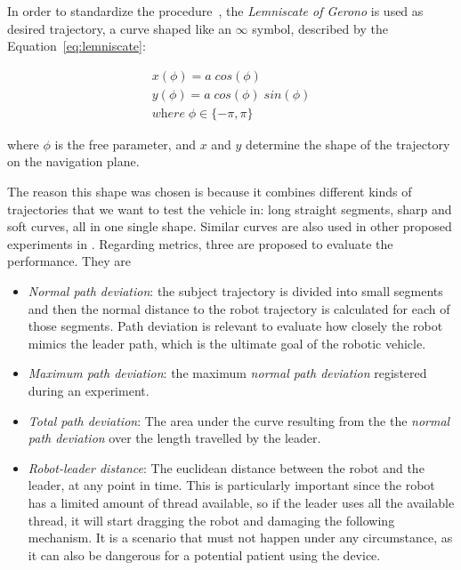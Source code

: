 \documentclass[journal]{IEEEtran}
\begin{document}
In order to standardize the procedure~\cite{Sprunk2016}, the \textit{Lemniscate of Gerono} is used as desired trajectory, a curve shaped like an $\infty$ symbol, described by the Equation~\ref{eq:lemniscate}:


\begin{equation}
\begin{array}{ll}  
 x( \phi ) = a \; cos( \phi )     \\
 y( \phi ) = a \; cos ( \phi )   \; sin ( \phi )    \\ 
 \textit{where}  \; \phi \in \lbrace -\pi , \pi  \rbrace
\end{array}
\label{eq:lemniscate}
\end{equation}

\noindent where $ \phi $ is the free parameter, and $x$ and $y$ determine the shape of the trajectory on the navigation plane.

The reason  this shape was chosen is because it combines different kinds of trajectories that we want to test the vehicle in: long straight segments, sharp and soft curves, all in one single shape. Similar curves are also used in other proposed experiments in \cite{Neto2015,Endo2015}.  Regarding metrics, three are proposed to evaluate the performance.  They are

\begin{itemize}
    \item \textit{Normal path deviation}: the subject trajectory is divided into small segments and then the normal distance to the robot trajectory is calculated for each of those segments. Path deviation is relevant to evaluate how closely the robot mimics the leader path, which is the ultimate goal of the robotic vehicle. 
    \item \textit{Maximum path deviation}: the maximum \textit{normal path deviation} registered during an experiment.
    \item \textit{Total path deviation}: The area under the curve resulting from the the \textit{normal path deviation} over the length travelled by the leader.
    \item \textit{Robot-leader distance}: The euclidean distance between the robot and the leader, at any point in time. This is particularly important since the robot has a limited amount of thread available, so if the leader uses all the available thread, it will start dragging the robot and damaging the following mechanism. It is a scenario that must not happen under any circumstance, as it can also be dangerous for a potential patient using the device. 
\end{itemize}{}
\end{document}
